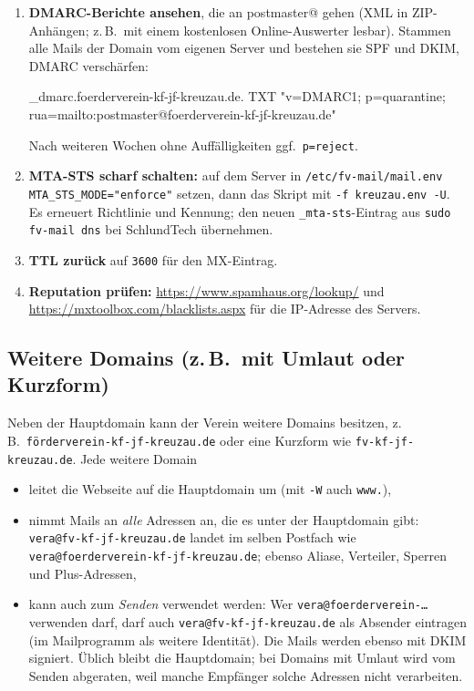 \documentclass[a4paper,fontsize=10pt]{scrartcl}
\newcommand*{\cmd}[1]{\texttt{#1}}
\newcommand*{\pfad}[1]{\texttt{#1}}
\newcommand*{\erledigt}{\makebox[1.4em][l]{\setlength{\fboxsep}{0pt}\fbox{\rule{0pt}{0.7em}\hspace{0.7em}}}}
\begin{document}
\begin{enumerate}[resume]
  \item\label{dmarc} \erledigt\textbf{DMARC-Berichte ansehen}, die an postmaster@ gehen (XML in
        ZIP-Anhängen; z.\,B.\ mit einem kostenlosen Online-Auswerter lesbar). Stammen
        alle Mails der Domain vom eigenen Server und bestehen sie SPF und DKIM, DMARC
        verschärfen:
\begin{befehl}
_dmarc.foerderverein-kf-jf-kreuzau.de.  TXT  "v=DMARC1; p=quarantine; rua=mailto:postmaster@foerderverein-kf-jf-kreuzau.de"
\end{befehl}
        Nach weiteren Wochen ohne Auffälligkeiten ggf.\ \cmd{p=reject}.
  \item \erledigt\textbf{MTA-STS scharf schalten:} auf dem Server in
        \pfad{/etc/fv-mail/mail.env} \cmd{MTA\_STS\_MODE="enforce"} setzen, dann das
        Skript mit \cmd{-f kreuzau.env -U}. Es erneuert Richtlinie und Kennung; den neuen
        \cmd{\_mta-sts}-Eintrag aus \cmd{sudo fv-mail dns} bei SchlundTech übernehmen.
  \item \erledigt\textbf{TTL zurück} auf \cmd{3600} für den MX-Eintrag.
  \item \erledigt\textbf{Reputation prüfen:} \url{https://www.spamhaus.org/lookup/} und
        \url{https://mxtoolbox.com/blacklists.aspx} für die IP-Adresse des Servers.
\end{enumerate}

\subsection{Weitere Domains (z.\,B.\ mit Umlaut oder Kurzform)}\label{sec:zusatzdomains}

Neben der Hauptdomain kann der Verein weitere Domains besitzen, z.\,B.\
\cmd{förderverein-kf-jf-kreuzau.de} oder eine Kurzform wie \cmd{fv-kf-jf-kreuzau.de}.
Jede weitere Domain
\begin{itemize}
  \item leitet die Webseite auf die Hauptdomain um (mit \cmd{-W} auch \cmd{www.}),
  \item nimmt Mails an \emph{alle} Adressen an, die es unter der Hauptdomain gibt:
        \cmd{vera@fv-kf-jf-kreuzau.de} landet im selben Postfach wie
        \cmd{vera@foerderverein-kf-jf-kreuzau.de}; ebenso Aliase, Verteiler, Sperren und
        Plus-Adressen,
  \item kann auch zum \emph{Senden} verwendet werden: Wer \cmd{vera@foerderverein-…}
        verwenden darf, darf auch \cmd{vera@fv-kf-jf-kreuzau.de} als Absender eintragen
        (im Mailprogramm als weitere Identität). Die Mails werden ebenso mit DKIM
        signiert. Üblich bleibt die Hauptdomain; bei Domains mit Umlaut wird vom Senden
        abgeraten, weil manche Empfänger solche Adressen nicht verarbeiten.
\end{itemize}
\end{document}
